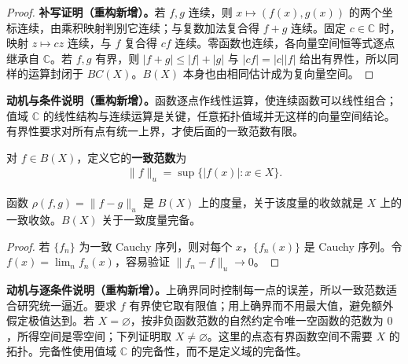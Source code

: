 \documentclass[../../main.tex]{subfiles}%
\begin{document}
\begin{proof}
\textbf{补写证明（重构新增）。}若 $f,g$ 连续，则 $x\mapsto(f(x),g(x))$ 的两个坐标连续，由乘积映射判别它连续；与复数加法复合得 $f+g$ 连续。固定 $c\in\mathbb C$ 时，映射 $z\mapsto cz$ 连续，与 $f$ 复合得 $cf$ 连续。零函数也连续，各向量空间恒等式逐点继承自 $\mathbb C$。若 $f,g$ 有界，则 $|f+g|\le|f|+|g|$ 与 $|cf|=|c||f|$ 给出有界性，所以同样的运算封闭于 $BC(X)$。$B(X)$ 本身也由相同估计成为复向量空间。
\end{proof}
\begin{remark}
\textbf{动机与条件说明（重构新增）。}函数逐点作线性运算，使连续函数可以线性组合；值域 $\mathbb C$ 的线性结构与连续运算是关键，任意拓扑值域并无这样的向量空间结论。有界性要求对所有点有统一上界，才使后面的一致范数有限。
\end{remark}
\begin{definition}[一致范数]\label{definition:ch04-uniform-norm}
对 $f\in B(X)$，定义它的\textbf{一致范数}为
\begin{align*}
\|f\|_u=\sup\{|f(x)|:x\in X\}.
\end{align*}
\end{definition}
\begin{proposition}\label{proposition:ch04-bounded-functions-complete}
函数 $\rho(f,g)=\|f-g\|_u$ 是 $B(X)$ 上的度量，关于该度量的收敛就是 $X$ 上的一致收敛。$B(X)$ 关于一致度量完备。
\end{proposition}
\begin{proof}
若 $\{f_n\}$ 为一致 Cauchy 序列，则对每个 $x$，$\{f_n(x)\}$ 是 Cauchy 序列。令 $f(x)=\lim_nf_n(x)$，容易验证 $\|f_n-f\|_u\to0$。
\end{proof}
\begin{remark}
\textbf{动机与逐条件说明（重构新增）。}上确界同时控制每一点的误差，所以一致范数适合研究统一逼近。要求 $f$ 有界使它取有限值；用上确界而不用最大值，避免额外假定极值达到。若 $X=\varnothing$，按非负函数范数的自然约定令唯一空函数的范数为 $0$，所得空间是零空间；下列证明取 $X\ne\varnothing$。这里的点态有界函数空间不需要 $X$ 的拓扑。完备性使用值域 $\mathbb C$ 的完备性，而不是定义域的完备性。
\end{remark}
\end{document}
